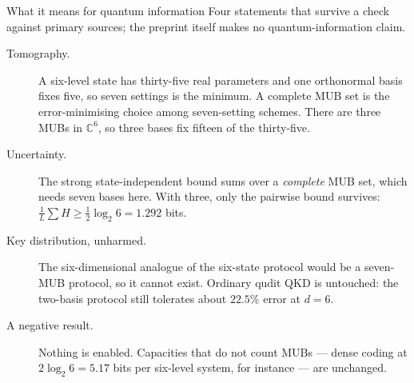 \documentclass[aspectratio=169,11pt]{beamer}
\newcommand{\C}{\mathbb{C}}
\begin{document}
\begin{frame}{What it means for quantum information}
  \vspace{2mm}
  {\footnotesize\color{faded} Four statements that survive a check against primary sources; the
  preprint itself makes no quantum-information claim.}

  \vspace{2mm}
  {\footnotesize
  \begin{description}
    \item[Tomography.] A six-level state has thirty-five real parameters and one orthonormal basis
      fixes five, so seven settings is the minimum. A complete MUB set is the error-minimising
      choice among seven-setting schemes. There are three MUBs in $\C^6$, so three bases fix fifteen
      of the thirty-five.

    \vspace{1.8mm}
    \item[Uncertainty.] The strong state-independent bound sums over a \emph{complete} MUB set, which
      needs seven bases here. With three, only the pairwise bound survives:
      $\tfrac1L\sum H\ge\tfrac12\log_2 6=1.292$ bits.

    \vspace{1.8mm}
    \item[Key distribution, unharmed.] The six-dimensional analogue of the six-state protocol would
      be a seven-MUB protocol, so it cannot exist. Ordinary qudit QKD is untouched: the two-basis
      protocol still tolerates about $22.5\%$ error at $d=6$.

    \vspace{1.8mm}
    \item[A negative result.] Nothing is enabled. Capacities that do not count MUBs --- dense coding
      at $2\log_2 6=5.17$ bits per six-level system, for instance --- are unchanged.
  \end{description}}
\end{frame}
\end{document}
